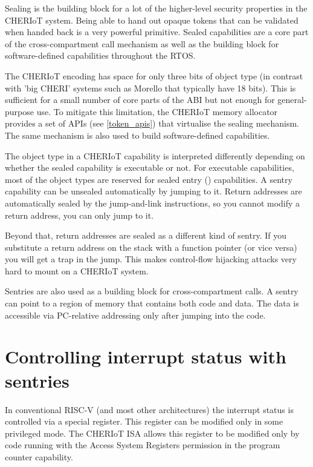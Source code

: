 Sealing is the building block for a lot of the higher-level security properties in the CHERIoT system.
Being able to hand out opaque tokens that can be validated when handed back is a very powerful primitive.
Sealed capabilities are a core part of the cross-compartment call mechanism as well as the building block for software-defined capabilities throughout the RTOS.

The CHERIoT encoding has space for only three bits of object type (in contrast with 'big CHERI' systems such as Morello that typically have 18 bits).
This is sufficient for a small number of core parts of the ABI but not enough for general-purpose use.
To mitigate this limitation, the CHERIoT memory allocator provides a set of APIs (see \ref{token_apis}) that virtualise the sealing mechanism.
The same mechanism is also used to build software-defined capabilities.

The object type in a CHERIoT capability is interpreted differently depending on whether the sealed capability is executable or not.
For executable capabilities, most of the object types are reserved for sealed entry () capabilities.
A sentry capability can be unsealed automatically by jumping to it.
Return addresses are automatically sealed by the jump-and-link instructions, so you cannot modify a return address, you can only jump to it.

Beyond that, return addresses are sealed as a different kind of sentry.
If you substitute a return address on the stack with a function pointer (or vice versa) you will get a trap in the jump.
This makes control-flow hijacking attacks very hard to mount on a CHERIoT system.

Sentries are also used as a building block for cross-compartment calls.
A sentry can point to a region of memory that contains both code and data.
The data is accessible via PC-relative addressing only after jumping into the code.

\section[label=interrupt_sentries]{Controlling interrupt status with sentries}

In conventional RISC-V (and most other architectures) the interrupt status is controlled via a special register.
This register can be modified only in some privileged mode.
The CHERIoT ISA allows this register to be modified only by code running with the Access System Registers permission in the program counter capability.

